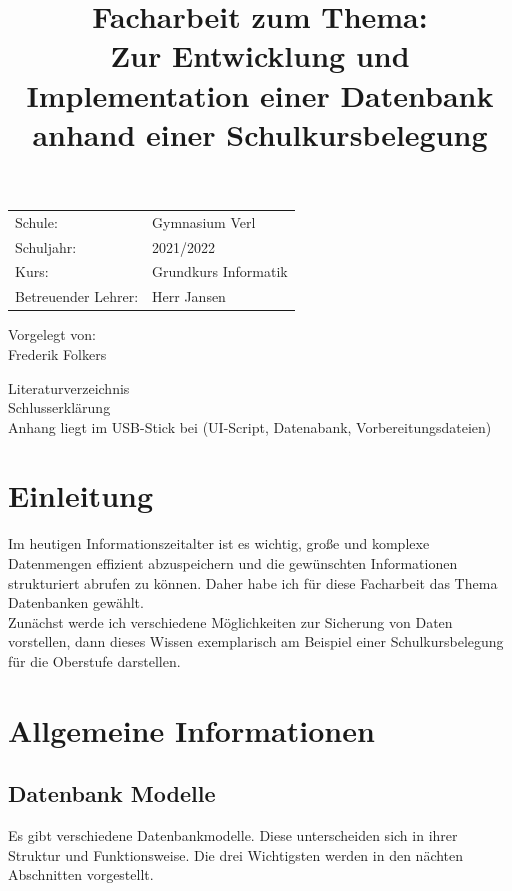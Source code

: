 \documentclass[a4paper, 12pt]{article}
\title{\small Facharbeit zum Thema: \\ \Large Zur Entwicklung und Implementation einer Datenbank anhand einer Schulkursbelegung}
\date{

}
\theoremstyle{plain}
\theoremstyle{definition}
\begin{document}
	\maketitle
	
	
	\begin{center}
	\vspace{3cm}
	\begin{tabular}{ll}
	Schule: & Gymnasium Verl \\
	Schuljahr: & 2021/2022\\
	Kurs: & Grundkurs Informatik\\
	Betreuender Lehrer: & Herr Jansen\\
	\end{tabular} 
	\vfill
	Vorgelegt von:\\
	Frederik Folkers
	\end{center}
	\newpage
	\tableofcontents	
	\vspace{1cm}
	Literaturverzeichnis\\
	Schlusserklärung\\
	Anhang liegt im USB-Stick bei (UI-Script, Datenabank, Vorbereitungsdateien)
	\newpage	
	
	\onehalfspace
	\section{Einleitung}
	\label{sec:intro}
	Im heutigen Informationszeitalter ist es wichtig, große und komplexe Datenmengen effizient abzuspeichern und die gewünschten Informationen strukturiert abrufen zu können. Daher habe ich für diese Facharbeit das Thema Datenbanken gewählt. \\
	Zunächst werde ich verschiedene Möglichkeiten zur Sicherung von Daten vorstellen, dann dieses Wissen exemplarisch am Beispiel einer Schulkursbelegung für die Oberstufe darstellen.
	
	\section{Allgemeine Informationen}
	\label{sec:allgInfo}
	
	\subsection{Datenbank Modelle}
	\label{sec:dbMod}
	Es gibt verschiedene Datenbankmodelle. Diese unterscheiden sich in ihrer Struktur und Funktionsweise. Die drei Wichtigsten werden in den nächten Abschnitten vorgestellt.
	
\end{document}
